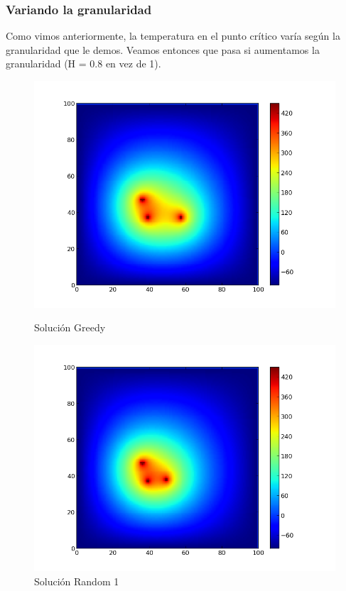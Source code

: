 \subsubsection{Variando la granularidad}

Como vimos anteriormente, la temperatura en el punto crítico varía según la granularidad que le demos. Veamos entonces que pasa si aumentamos la granularidad (H = 0.8 en vez de 1).
\clearpage
\begin{figure}[htb]
\begin{center}
\includegraphics[scale=0.40]{imagenes/test6_g08_greedy.png} 
\caption{Solución Greedy} 

        \end{center}
\endminipage\hfill
{}
\begin{center}
\includegraphics[scale=0.40]{imagenes/test6_g08_random.png} 
\caption{Solución Random 1} 
        \end{center}
\endminipage\hfill 
\end{figure}

